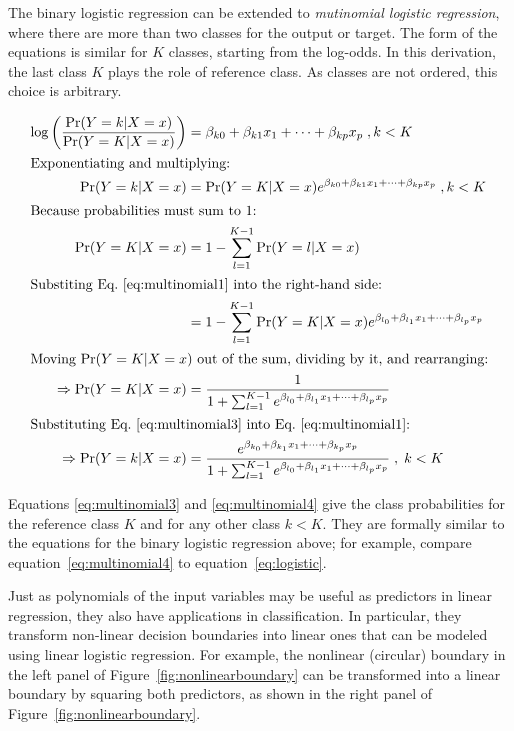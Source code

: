 \begin{advanced}
The binary logistic regression can be extended to \emph{mutinomial logistic regression}, where there are more than two classes for the output or target. The form of the equations is similar for $K$ classes, starting from the log-odds. In this derivation, the last class $K$ plays the role of reference class. As classes are not ordered, this choice is arbitrary.

\begin{align}
\log \left( \frac{\Pr(Y=k | X=x)}{\Pr(Y=K | X=x)}\right) &= \beta_{k0}+\beta_{k1}x_1 + \cdots + \beta_{kp}x_p \; , k<K \nonumber \\
\intertext{Exponentiating and multiplying:}
\Pr(Y=k | X=x) &= \Pr(Y=K | X=x) e^{\beta_{k0}+\beta_{k1}x_1 + \cdots + \beta_{kp}x_p} \;, k<K \label{eq:multinomial1} \\
\intertext{Because probabilities must sum to 1:}
\Pr(Y=K | X=x) &= 1 - \sum_{l=1}^{K-1} \Pr(Y=l | X=x) \nonumber \\
\intertext{Substiting Eq.~\ref{eq:multinomial1} into the right-hand side:}
&= 1 - \sum_{l=1}^{K-1} \Pr(Y=K | X=x) e^{\beta_{l_0}+\beta_{l_1}x_1 + \cdots + \beta_{l_p}x_p} \nonumber \\
\intertext{Moving $\Pr(Y=K|X=x)$ out of the sum, dividing by it, and rearranging:}
\Rightarrow \Pr(Y=K | X = x) &= \frac{1}{1 + \sum_{l=1}^{K-1} e^{\beta_{l_0}+\beta_{l_1}x_1 + \cdots + \beta_{l_p}x_p}} \label{eq:multinomial3} \\
\intertext{Substituting Eq.~\ref{eq:multinomial3} into Eq.~\ref{eq:multinomial1}:}
\Rightarrow \Pr(Y=k|X=x) &= \frac{e^{\beta_{k_0}+\beta_{k_1}x_1 + \cdots + \beta_{k_p}x_p}}{1 + \sum_{l=1}^{K-1} e^{\beta_{l_0}+\beta_{l_1}x_1 + \cdots + \beta_{l_p}x_p}} \;, \; k < K \label{eq:multinomial4} 
\end{align}

Equations \ref{eq:multinomial3} and \ref{eq:multinomial4} give the class probabilities for the reference class $K$ and for any other class $k < K$. They are formally similar to the equations for the binary logistic regression above; for example, compare equation~\ref{eq:multinomial4} to equation~\ref{eq:logistic}.

Just as polynomials of the input variables may be useful as predictors in linear regression, they also have applications in classification. In particular, they transform non-linear decision boundaries into linear ones that can be modeled using linear logistic regression. For example, the nonlinear (circular) boundary in the left panel of Figure~\ref{fig:nonlinearboundary} can be transformed into a linear boundary by squaring both predictors, as shown in the right panel of Figure~\ref{fig:nonlinearboundary}.


\end{advanced}
